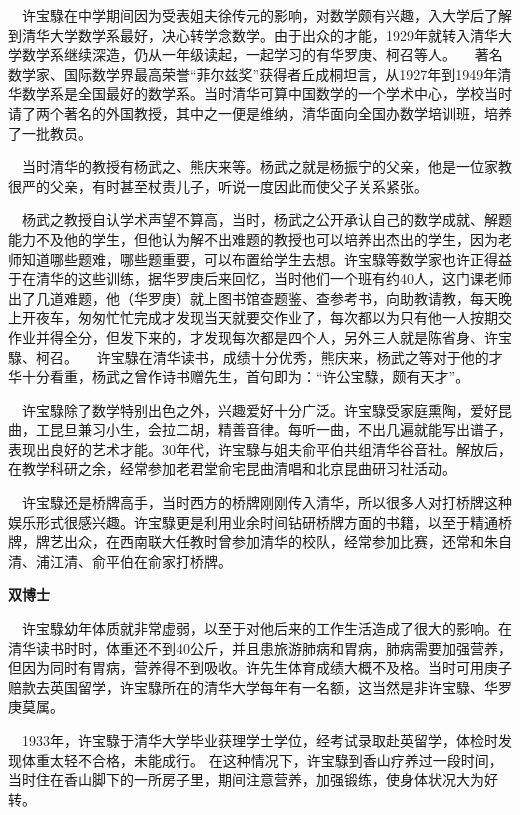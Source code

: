 $\quad$许宝騄在中学期间因为受表姐夫徐传元的影响，对数学颇有兴趣，入大学后了解到清华大学数学系最好，决心转学念数学。由于出众的才能，1929年就转入清华大学数学系继续深造，仍从一年级读起，一起学习的有华罗庚、柯召等人。
$\quad$著名数学家、国际数学界最高荣誉“菲尔兹奖”获得者丘成桐坦言，从1927年到1949年清华数学系是全国最好的数学系。当时清华可算中国数学的一个学术中心，学校当时请了两个著名的外国教授，其中之一便是维纳，清华面向全国办数学培训班，培养了一批教员。

$\quad$当时清华的教授有杨武之、熊庆来等。杨武之就是杨振宁的父亲，他是一位家教很严的父亲，有时甚至杖责儿子，听说一度因此而使父子关系紧张。

$\quad$杨武之教授自认学术声望不算高，当时，杨武之公开承认自己的数学成就、解题能力不及他的学生，但他认为解不出难题的教授也可以培养出杰出的学生，因为老师知道哪些题难，哪些题重要，可以布置给学生去想。许宝騄等数学家也许正得益于在清华的这些训练，据华罗庚后来回忆，当时他们一个班有约40人，这门课老师出了几道难题，他（华罗庚）就上图书馆查题鉴、查参考书，向助教请教，每天晚上开夜车，匆匆忙忙完成才发现当天就要交作业了，每次都以为只有他一人按期交作业并得全分，但发下来的，才发现每次都是四个人，另外三人就是陈省身、许宝騄、柯召。
$\quad$许宝騄在清华读书，成绩十分优秀，熊庆来，杨武之等对于他的才华十分看重，杨武之曾作诗书赠先生，首句即为：“许公宝騄，颇有天才”。

$\quad$许宝騄除了数学特别出色之外，兴趣爱好十分广泛。许宝騄受家庭熏陶，爱好昆曲，工昆旦兼习小生，会拉二胡，精善音律。每听一曲，不出几遍就能写出谱子，表现出良好的艺术才能。30年代，许宝騄与姐夫俞平伯共组清华谷音社。解放后，在教学科研之余，经常参加老君堂俞宅昆曲清唱和北京昆曲研习社活动。

$\quad$许宝騄还是桥牌高手，当时西方的桥牌刚刚传入清华，所以很多人对打桥牌这种娱乐形式很感兴趣。许宝騄更是利用业余时间钻研桥牌方面的书籍，以至于精通桥牌，牌艺出众，在西南联大任教时曾参加清华的校队，经常参加比赛，还常和朱自清、浦江清、俞平伯在俞家打桥牌。

\textbf{双博士}

$\quad$许宝騄幼年体质就非常虚弱，以至于对他后来的工作生活造成了很大的影响。在清华读书时时，体重还不到40公斤，并且患旅游肺病和胃病，肺病需要加强营养，但因为同时有胃病，营养得不到吸收。许先生体育成绩大概不及格。当时可用庚子赔款去英国留学，许宝騄所在的清华大学每年有一名额，这当然是非许宝騄、华罗庚莫属。

$\quad$1933年，许宝騄于清华大学毕业获理学士学位，经考试录取赴英留学，体检时发现体重太轻不合格，未能成行。
在这种情况下，许宝騄到香山疗养过一段时间，当时住在香山脚下的一所房子里，期间注意营养，加强锻练，使身体状况大为好转。

